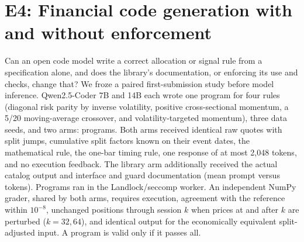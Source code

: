 \section{E4: Financial code generation with and without enforcement}
\label{sec:codegen}
Can an open code model write a correct allocation or signal rule from a specification alone,
and does the library's documentation, or enforcing its use and checks, change that? We froze
a paired first-submission study before model inference. Qwen2.5-Coder 7B and 14B each
wrote one program for four rules (diagonal risk parity by inverse volatility, positive
cross-sectional momentum, a 5/20 moving-average crossover, and volatility-targeted
momentum), three data seeds, and two arms: \CGPlanned{} programs. Both arms received
identical raw quotes with split jumps, cumulative split factors known on their event dates,
the mathematical rule, the one-bar timing rule, one response of at most 2,048 tokens, and no
execution feedback. The library arm additionally
received the actual catalog output and interface and guard documentation (mean prompt
\CGFourteenLibraryInTokens{} versus \CGFourteenRawInTokens{} tokens). Programs ran in the
Landlock/seccomp worker. An independent NumPy grader, shared by both arms, requires
execution, agreement with the reference within $10^{-8}$, unchanged positions through
session $k$ when prices at and after $k$ are perturbed ($k=32,64$), and identical output for
the economically equivalent split-adjusted input. A program is valid only if it passes all.

